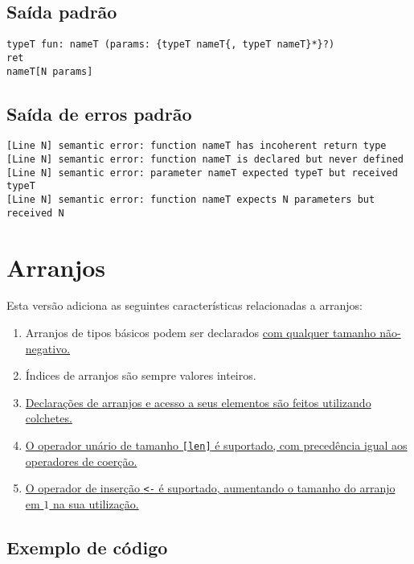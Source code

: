 \documentclass{article}
\newenvironment{smallenum}{
    \vspace{-1mm}
    \begin{enumerate}[label=\roman*.]
    \setlength{\parskip}{0pt}
    \setlength{\itemsep}{2pt}
}{
    \vspace{-2mm}
    \end{enumerate}
}
\begin{document}
\subsection{Saída padrão}

\begin{verbatim}
typeT fun: nameT (params: {typeT nameT{, typeT nameT}*}?)
ret
nameT[N params]
\end{verbatim}

\subsection{Saída de erros padrão}

\begin{verbatim}
[Line N] semantic error: function nameT has incoherent return type
[Line N] semantic error: function nameT is declared but never defined
[Line N] semantic error: parameter nameT expected typeT but received typeT
[Line N] semantic error: function nameT expects N parameters but received N
\end{verbatim}

\section{Arranjos}

Esta versão adiciona as seguintes características relacionadas a arranjos:

\begin{smallenum}

\item Arranjos de tipos básicos podem ser declarados \uline{com qualquer
    tamanho não-negativo.}

\item Índices de arranjos são sempre valores inteiros.

\item \uline{Declarações de arranjos e acesso a seus elementos são feitos
    utilizando colchetes.}

\item \uline{O operador unário de tamanho \texttt{[len]} é suportado, com
    precedência igual aos operadores de coerção.}

\item \uline{O operador de inserção \texttt{<-} é suportado, aumentando
    o tamanho do arranjo em $1$ na sua utilização.}

\end{smallenum}

\subsection{Exemplo de código}
\end{document}
